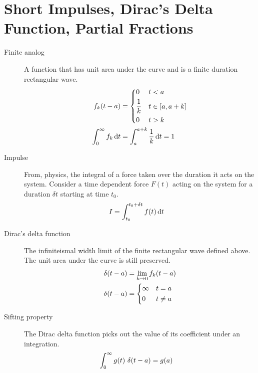 \section{Short Impulses, Dirac's Delta Function, Partial Fractions}
\begin{description}
    \item[Finite analog] A function that has unit area under the curve and is a finite
        duration rectangular wave.
        \begin{align}
            f_k(t-a)                    & =
            \begin{dcases}
                0           & t < a          \\
                \frac{1}{k} & t \in [a, a+k] \\
                0           & t > k
            \end{dcases}                                        \\
            \int_{0}^{\infty} f_k \dl t & =\int_{a}^{a+k} \frac{1}{k} \dl t = 1
        \end{align}
    \item[Impulse] From, physics, the integral of a force taken over the duration
        it acts on the system. Consider a time dependent force $ F(t) $ acting on the
        system for a duration $ \delta t $ starting at time $ t_0 $.
        \begin{align}
            I & = \int_{t_0}^{t_0 + \delta t} f(t) \dl t
        \end{align}
    \item[Dirac's delta function] The infiniteismal width limit of the finite
        rectangular wave defined above. The unit area under the curve is still preserved.
        \begin{align}
            \delta(t-a) & = \lim_{k \rightarrow 0} f_k (t - a) \\
            \delta(t-a) & = \begin{dcases}
                                \infty & t = a    \\
                                0      & t \neq a
                            \end{dcases}
        \end{align}
    \item[Sifting property] The Dirac delta function picks out the value of its
        coefficient under an integration.
        \begin{align}
            \int_{0}^{\infty} g(t)\ \delta(t-a) & = g(a)
        \end{align}

\end{description}
